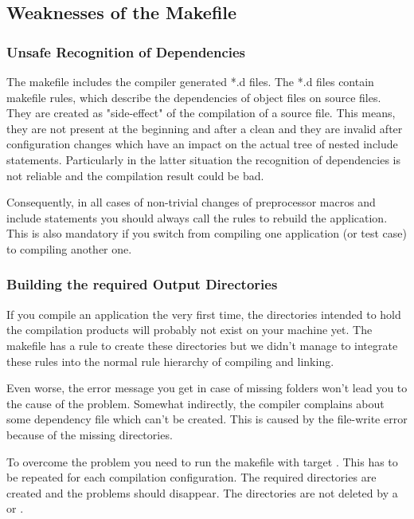 \subsection{Weaknesses of the Makefile}

\subsubsection{Unsafe Recognition of Dependencies}

The makefile includes the compiler generated *.d files. The *.d files
contain makefile rules, which describe the dependencies of object files on
source files. They are created as "side-effect" of the compilation of a
source file. This means, they are not present at the beginning and after a
clean and they are invalid after configuration changes which have an
impact on the actual tree of nested include statements. Particularly in
the latter situation the recognition of dependencies is not reliable and
the compilation result could be bad.

Consequently, in all cases of non-trivial changes of preprocessor macros
and include statements you should always call the rules to rebuild the
application. This is also mandatory if you switch from compiling one
\rtos{} application (or test case) to compiling another one.


\subsubsection{Building the required Output Directories}

If you compile an \rtos{} application the very first time, the directories
intended to hold the compilation products will probably not exist on your
machine yet. The makefile has a rule to create these directories but we
didn't manage to integrate these rules into the normal rule hierarchy of
compiling and linking.

Even worse, the error message you get in case of missing folders won't
lead you to the cause of the problem. Somewhat indirectly, the compiler
complains about some dependency file which can't be created. This is
caused by the file-write error because of the missing directories.

To overcome the problem you need to run the makefile with target
. This has to be repeated for each compilation
configuration. The required directories are created and the problems
should disappear. The directories are not deleted by a  or
.


